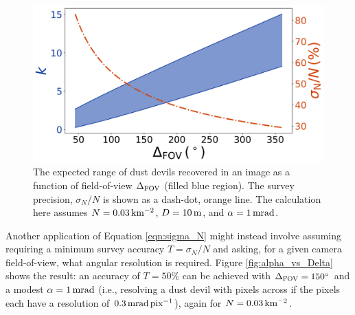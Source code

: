 \documentclass{aastex63}
\begin{document}
\begin{figure}
    \centering
    \includegraphics[width=\textwidth]{figures/DDs_vs_Delta.jpg}
    \caption{The expected range of dust devils recovered in an image as a function of field-of-view $\Delta_{\rm FOV}$ (filled blue region). The survey precision, $\sigma_N/N$ is shown as a dash-dot, orange line. The calculation here assumes $N = 0.03\,{\rm km^{-2}}$, $D = 10\,{\rm m}$, and $\alpha = 1\,{\rm mrad}$.}
    \label{fig:DDs_vs_Delta}
\end{figure}


Another application of Equation \ref{eqn:sigma_N} might instead involve assuming requiring a minimum survey accuracy $T = \sigma_N/N$ and asking, for a given camera field-of-view, what angular resolution is required. Figure \ref{fig:alpha_vs_Delta} shows the result: an accuracy of $T = 50\%$ can be achieved with $\Delta_{\rm FOV} = 150^\circ$ and a modest $\alpha = 1\,{\rm mrad}$ (i.e., resolving a dust devil with pixels across if the pixels each have a resolution of $0.3\,{\rm mrad\, pix^{-1}}$), again for $N = 0.03\,{\rm km^{-2}}$.
\end{document}
